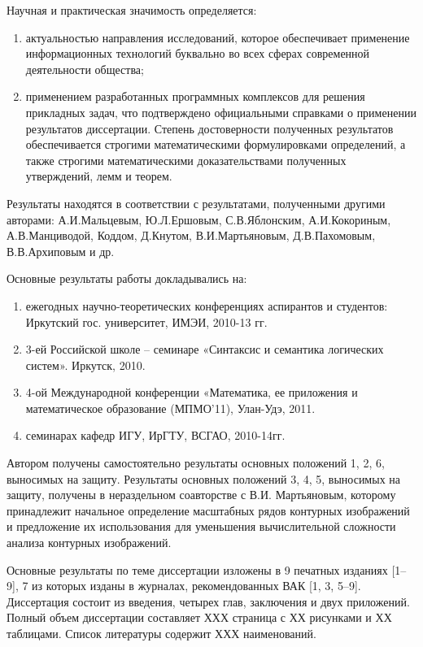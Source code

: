 \noindent
Научная и практическая значимость определяется:
\begin{enumerate}
\item актуальностью направления исследований, которое обеспечивает применение информационных технологий буквально во всех сферах современной деятельности общества;
\item применением разработанных программных комплексов для решения прикладных задач, что подтверждено официальными справками о применении результатов диссертации.
Степень достоверности полученных результатов обеспечивается строгими математическими формулировками определений, а также строгими математическими доказательствами полученных утверждений, лемм и теорем.
\end{enumerate}
Результаты находятся в соответствии с результатами, полученными другими авторами: А.И.Мальцевым, Ю.Л.Ершовым, С.В.Яблонским, А.И.Кокориным, А.В.Манциводой,  Коддом, Д.Кнутом, В.И.Мартьяновым, Д.В.Пахомовым, В.В.Архиповым и др.


\noindent
Основные результаты работы докладывались на: 
\begin{enumerate}
	\item ежегодных научно-теоретических конференциях аспирантов и студентов:  Иркутский  гос. университет, ИМЭИ, 2010-13 гг.
	\item 3-ей Российской школе – семинаре «Синтаксис и семантика логических систем». Иркутск, 2010.
	\item 4-ой Международной конференции «Математика, ее приложения и математическое образование (МПМО’11),  Улан-Удэ, 2011.
	\item семинарах кафедр ИГУ, ИрГТУ, ВСГАО, 2010-14гг.
\end{enumerate}

Автором получены самостоятельно результаты основных положений 1, 2, 6,  выносимых  на защиту.  Результаты основных положений 3, 4, 5,  выносимых  на защиту, получены в нераздельном соавторстве с В.И. Мартьяновым, которому принадлежит начальное определение масштабных рядов контурных изображений и предложение их использования для уменьшения вычислительной сложности анализа контурных изображений.

Основные результаты по теме диссертации изложены в 9 печатных изданиях [1–9], 7 из которых изданы в журналах, рекомендованных ВАК [1, 3, 5–9]. Диссертация состоит из введения, четырех глав, заключения и двух приложений. Полный объем диссертации составляет ХХХ страница с ХХ рисунками и ХХ таблицами. Список литературы содержит ХХХ наименований.
\clearpage
